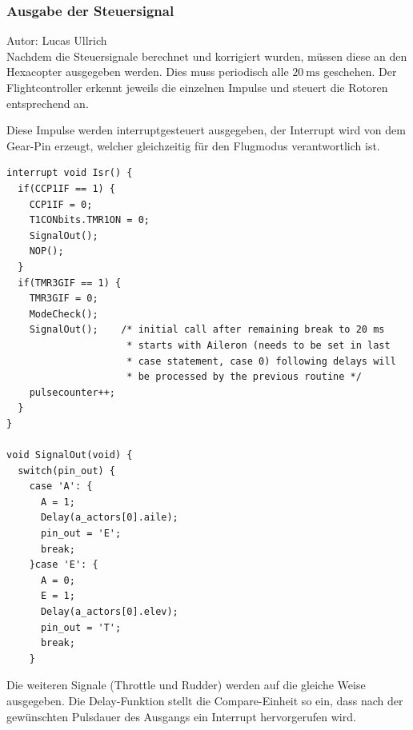     \subsubsection{Ausgabe der Steuersignal}
    Autor: Lucas Ullrich\\
    Nachdem die Steuersignale berechnet und korrigiert wurden, müssen diese an den Hexacopter ausgegeben werden. Dies muss periodisch alle $\SI{20}{\milli\second}$ geschehen.
    Der Flightcontroller erkennt jeweils die einzelnen Impulse und steuert die Rotoren entsprechend an.

    Diese Impulse werden interruptgesteuert ausgegeben, der Interrupt wird von dem Gear-Pin erzeugt, welcher gleichzeitig für den Flugmodus verantwortlich ist.

    \lstset{language = c}
    \begin{lstlisting}
interrupt void Isr() {
  if(CCP1IF == 1) {
    CCP1IF = 0;
    T1CONbits.TMR1ON = 0;
    SignalOut();
    NOP();
  }
  if(TMR3GIF == 1) {
    TMR3GIF = 0;
    ModeCheck();
    SignalOut();    /* initial call after remaining break to 20 ms
                     * starts with Aileron (needs to be set in last
                     * case statement, case 0) following delays will
                     * be processed by the previous routine */
    pulsecounter++;
  }
}

void SignalOut(void) {
  switch(pin_out) {
    case 'A': {
      A = 1;
      Delay(a_actors[0].aile);
      pin_out = 'E';
      break;
    }case 'E': {
      A = 0;
      E = 1;
      Delay(a_actors[0].elev);
      pin_out = 'T';
      break;
    }
    \end{lstlisting}
    Die weiteren Signale (Throttle und Rudder) werden auf die gleiche Weise ausgegeben.
    Die Delay-Funktion stellt die Compare-Einheit so ein, dass nach der gewünschten Pulsdauer des Ausgangs ein Interrupt hervorgerufen wird.




